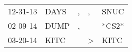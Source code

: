 \begin{supertabular}{p{0.07\textwidth}p{0.06\textwidth}p{0.02\textwidth}p{0.02\textwidth}p{0.06\textwidth}}
 12-31-13\textsuperscript{} &  DAYS\textsuperscript{} &  , &             , &  SNUC\textsuperscript{} \\
 02-09-14\textsuperscript{} &  DUMP\textsuperscript{} &  , &               &                   *CS2* \\
 03-20-14\textsuperscript{} &  KITC\textsuperscript{} &    &  \textgreater &  KITC\textsuperscript{} \\
\end{supertabular}
